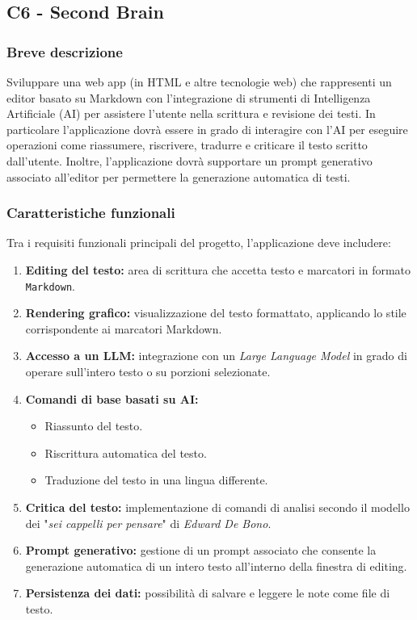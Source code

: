 \documentclass[a4paper,11pt]{article}
\begin{document}
\subsection{C6 - Second Brain}

\subsubsection{Breve descrizione}
Sviluppare una web app (in HTML e altre tecnologie web) che rappresenti un editor basato su Markdown con l'integrazione di strumenti di Intelligenza Artificiale (AI) per assistere l'utente nella scrittura e revisione dei testi.
In particolare l'applicazione dovrà essere in grado di interagire con l'AI per eseguire operazioni come riassumere, riscrivere, tradurre e criticare il testo scritto dall'utente. Inoltre, l'applicazione dovrà supportare un prompt generativo associato all'editor per permettere la generazione automatica di testi.
\subsubsection{Caratteristiche funzionali}
Tra i requisiti funzionali principali del progetto, l'applicazione deve includere:
\begin{enumerate}[noitemsep, topsep=0pt]
 \item \textbf{Editing del testo:} area di scrittura che accetta testo e marcatori in formato \texttt{Markdown}.
 \item \textbf{Rendering grafico:} visualizzazione del testo formattato, applicando lo stile corrispondente ai marcatori Markdown.
 \item \textbf{Accesso a un LLM:} integrazione con un \textit{Large Language Model} in grado di operare sull'intero testo o su porzioni selezionate.
 \item \textbf{Comandi di base basati su AI:}
 \begin{itemize}
  \item Riassunto del testo.
  \item Riscrittura automatica del testo.
  \item Traduzione del testo in una lingua differente.
 \end{itemize}
 
 \item \textbf{Critica del testo:} implementazione di comandi di analisi secondo il modello dei "\textit{sei cappelli per pensare}" di \textit{Edward De Bono}.
 \item \textbf{Prompt generativo:} gestione di un prompt associato che consente la generazione automatica di un intero testo all'interno della finestra di editing.
 \item \textbf{Persistenza dei dati:} possibilità di salvare e leggere le note come file di testo.
\end{enumerate}
\end{document}
